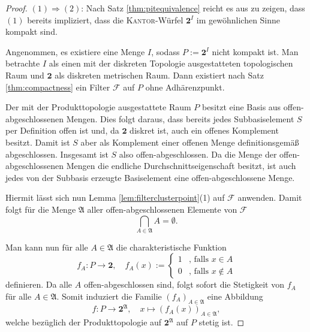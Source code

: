 \begin{proof}
  $(1) \Rightarrow(2) $: Nach Satz \ref{thm:pitequivalence} reicht es aus zu zeigen, dass $(1)$ bereits impliziert, dass die \textsc{Kantor}\hyp{}Würfel $\mathbf{2}^I$ im gewöhnlichen Sinne kompakt sind.

  Angenommen, es existiere eine Menge $I$, sodass $P:= \mathbf{2}^I$ nicht kompakt ist.
  Man betrachte $I$ als einen mit der diskreten Topologie ausgestatteten topologischen Raum und $\mathbf{2}$ als diskreten metrischen Raum.
  Dann existiert nach Satz \ref{thm:compactness} ein Filter $\mathcal{F}$ auf $P$ ohne Adhärenzpunkt.

  Der mit der Produkttopologie ausgestattete Raum $P$ besitzt eine Basis aus offen\hyp{}abgeschlossenen Mengen.
  Dies folgt daraus, dass bereits jedes Subbasiselement $S$ per Definition offen ist und, da $\mathbf{2}$ diskret ist, auch ein offenes Komplement besitzt.
  Damit ist $S$ aber als Komplement einer offenen Menge definitionsgemäß abgeschlossen.
  Insgesamt ist $S$ also offen\hyp{}abgeschlossen.
  Da die Menge der offen\hyp{}abgeschlossenen Mengen die endliche Durchschnittseigenschaft besitzt, ist auch jedes von der Subbasis erzeugte Basiselement eine offen\hyp{}abgeschlossene Menge.

  Hiermit lässt sich nun Lemma \ref{lem:filterclusterpoint}(1) auf $\mathcal{F}$ anwenden.
  Damit folgt für die Menge $\mathfrak{A}$ aller offen\hyp{}abgeschlossenen Elemente von $\mathcal{F}$
  \begin{displaymath}
    \bigcap_{A \in \mathfrak{A}} A = \emptyset \tag{$\star$}.
  \end{displaymath}

  Man kann nun für alle $A \in \mathfrak{A}$ die charakteristische Funktion
  \begin{equation}
    \label{eq:clopenmap}
    f_A \colon P \to \mathbf{2}, \quad
    f_A(x) := 
    \begin{cases}
      1 &\text{, falls } x \in A \\
      0 &\text{, falls } x \not\in A
    \end{cases}
  \end{equation}
  definieren.
  Da alle $A$ offen\hyp{}abgeschlossen sind, folgt sofort die Stetigkeit von $f_A$ für alle $A \in \mathfrak{A}$.
  Somit induziert die Familie $(f_A)_{A \in \mathfrak{A}}$ eine Abbildung 
  \begin{displaymath}
    f \colon P \to \mathbf{2}^\mathfrak{A}, \quad
    x \mapsto (f_A(x))_{A \in \mathfrak{A}},
  \end{displaymath}
  welche bezüglich der Produkttopologie auf $\mathbf{2}^\mathfrak{A}$ auf $P$ stetig ist.


\end{proof}
